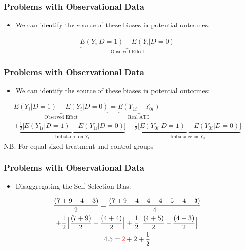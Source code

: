 \documentclass[xcolor=x11names,compress]{beamer}\usepackage[]{graphicx}\usepackage[]{color}
\renewcommand{\(}{\begin{columns}}
\renewcommand{\)}{\end{columns}}
\newcommand{\<}[1]{\begin{column}{#1}}
\renewcommand{\>}{\end{column}}
\begin{document}
\begin{frame}
\frametitle{Problems with Observational Data}
\begin{itemize}
\item We can identify the source of these biases in potential outcomes:
\pause
\end{itemize}
\begin{multline}
\underbrace{E(Y_i|D=1)-E(Y_i|D=0)}_\text{Observed Effect}
\end{multline}
\end{frame}

\begin{frame}
\frametitle{Problems with Observational Data}
\begin{itemize}
\item We can identify the source of these biases in potential outcomes:
\end{itemize}
\begin{multline}
\underbrace{E(Y_i|D=1)-E(Y_i|D=0)}_\text{Observed Effect} = \underbrace{E(Y_{1i} - Y_{0i})}_\text{Real ATE} \\ + \underbrace{\frac{1}{2}\Big[ E(Y_{1i}|D=1) - E(Y_{1i}|D=0) \Big]}_\text{Imbalance on $Y_1$} + \underbrace{\frac{1}{2}\Big[ E(Y_{0i}|D=1) - E(Y_{0i}|D=0) \Big]}_\text{Imbalance on $Y_0$}
\end{multline}
\footnotesize
NB: For equal-sized treatment and control groups
\normalsize
\end{frame}

\begin{frame}
\frametitle{Problems with Observational Data}
\begin{itemize}
\item Disaggregating the Self-Selection Bias:
\end{itemize}
\begin{center}
\begin{multline}
\frac{(7+9-4-3)}{2} = \frac{(7+9+4+4-4-5-4-3)}{4} \\+ \frac{1}{2}\Big[ \frac{(7+9)}{2} - \frac{(4+4)}{2} \Big] + \frac{1}{2} \Big[ \frac{(4+5)}{2}- \frac{(4+3)}{2}\Big] \\
4.5 = \color{red}2 \color{black}+ 2 + \frac{1}{2}
\end{multline}
\end{center}
\end{frame}
\end{document}
